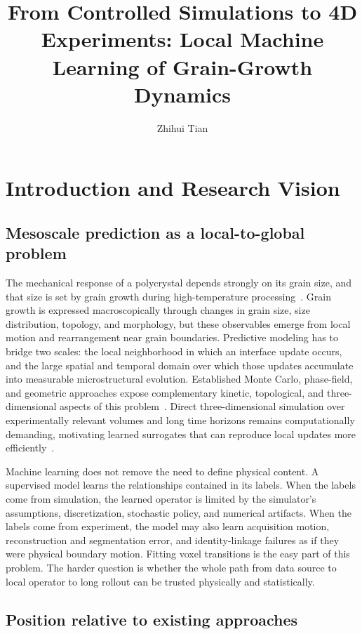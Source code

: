 \documentclass[proposalMode]{ufdissertation}
\title{From Controlled Simulations to 4D Experiments: Local Machine Learning of Grain-Growth Dynamics}
\author{Zhihui Tian}
\begin{document}
\chapter{Introduction and Research Vision}

\section{Mesoscale prediction as a local-to-global problem}

The mechanical response of a polycrystal depends strongly on its grain size, and that size is set by grain growth during high-temperature processing~\cite{hall1951deformation,petch1953cleavage,hillert1965growth}. Grain growth is expressed macroscopically through changes in grain size, size distribution, topology, and morphology, but these observables emerge from local motion and rearrangement near grain boundaries. Predictive modeling has to bridge two scales: the local neighborhood in which an interface update occurs, and the large spatial and temporal domain over which those updates accumulate into measurable microstructural evolution. Established Monte Carlo, phase-field, and geometric approaches expose complementary kinetic, topological, and three-dimensional aspects of this problem~\cite{mullins1956motion,hillert1965growth,anderson1984kinetics,srolovitz1984topology,chen2002phasefield,krill2002phasefield,macpherson2007vonneumann,lazar2011threeD}. Direct three-dimensional simulation over experimentally relevant volumes and long time horizons remains computationally demanding, motivating learned surrogates that can reproduce local updates more efficiently~\cite{montes2021surrogate,yan2022primme,qin2024graingnn,tian2026threeDprimme}.

Machine learning does not remove the need to define physical content. A supervised model learns the relationships contained in its labels. When the labels come from simulation, the learned operator is limited by the simulator's assumptions, discretization, stochastic policy, and numerical artifacts. When the labels come from experiment, the model may also learn acquisition motion, reconstruction and segmentation error, and identity-linkage failures as if they were physical boundary motion. Fitting voxel transitions is the easy part of this problem. The harder question is whether the whole path from data source to local operator to long rollout can be trusted physically and statistically.

\section{Position relative to existing approaches}
\end{document}
